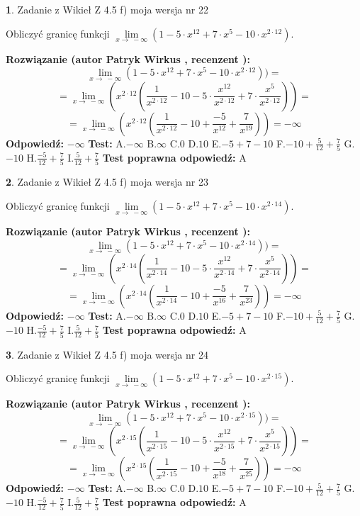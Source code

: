 \documentclass[12pt, a4paper]{article}
\theoremstyle{definition} %
\newtheorem{zad}{}
\newcommand{\zadStart}[1]{\begin{zad}#1\newline}
\newcommand{\zadStop}{\end{zad}}
\newcommand{\rozwStart}[2]{\noindent \textbf{Rozwiązanie (autor #1 , recenzent #2): }\newline}
\newcommand{\rozwStop}{\newline}
\newcommand{\odpStart}{\noindent \textbf{Odpowiedź:}\newline}
\newcommand{\odpStop}{\newline}
\newcommand{\testStart}{\noindent \textbf{Test:}\newline}
\newcommand{\testStop}{\newline}
\newcommand{\kluczStart}{\noindent \textbf{Test poprawna odpowiedź:}\newline}
\newcommand{\kluczStop}{\newline}
\begin{document}
\zadStart{Zadanie z Wikieł Z 4.5 f) moja wersja nr 22}



Obliczyć granicę funkcji  $\lim\limits_{x\to\ -\infty}(1 - 5 \cdot x^{12}+7 \cdot x^{5}- 10 \cdot x^{2\cdot12})$.
\zadStop
\rozwStart{Patryk Wirkus}{}
$$\lim\limits_{x\to\ -\infty}(1 - 5 \cdot x^{12}+7 \cdot x^{5}- 10 \cdot x^{2\cdot12}))=$$
$$=\lim\limits_{x\to\ -\infty}(x^{2\cdot12}(\frac{1}{x^{2\cdot12}}-10 -5 \cdot \frac{x^{12}}{x^{2\cdot12}}+7 \cdot \frac{x^{5}}{x^{2\cdot12}}))=$$
$$=\lim\limits_{x\to\ -\infty}(x^{2\cdot12}(\frac{1}{x^{2\cdot12}}-10 + \frac{-5}{x^{12}}+ \frac{7}{x^{19}}))=-\infty$$
\rozwStop
\odpStart
$-\infty$
\odpStop
\testStart
A.$-\infty$ B.$\infty$ C.$0$ D.$10$ E.$-5 + 7 - 10$
F.$-10+\frac{5}{12}+\frac{7}{5}$ G.$-10$
H.$\frac{-5}{12}+\frac{7}{5}$
I.$\frac{5}{12}+\frac{7}{5}$
\testStop
\kluczStart
A
\kluczStop



\zadStart{Zadanie z Wikieł Z 4.5 f) moja wersja nr 23}



Obliczyć granicę funkcji  $\lim\limits_{x\to\ -\infty}(1 - 5 \cdot x^{12}+7 \cdot x^{5}- 10 \cdot x^{2\cdot14})$.
\zadStop
\rozwStart{Patryk Wirkus}{}
$$\lim\limits_{x\to\ -\infty}(1 - 5 \cdot x^{12}+7 \cdot x^{5}- 10 \cdot x^{2\cdot14}))=$$
$$=\lim\limits_{x\to\ -\infty}(x^{2\cdot14}(\frac{1}{x^{2\cdot14}}-10 -5 \cdot \frac{x^{12}}{x^{2\cdot14}}+7 \cdot \frac{x^{5}}{x^{2\cdot14}}))=$$
$$=\lim\limits_{x\to\ -\infty}(x^{2\cdot14}(\frac{1}{x^{2\cdot14}}-10 + \frac{-5}{x^{16}}+ \frac{7}{x^{23}}))=-\infty$$
\rozwStop
\odpStart
$-\infty$
\odpStop
\testStart
A.$-\infty$ B.$\infty$ C.$0$ D.$10$ E.$-5 + 7 - 10$
F.$-10+\frac{5}{12}+\frac{7}{5}$ G.$-10$
H.$\frac{-5}{12}+\frac{7}{5}$
I.$\frac{5}{12}+\frac{7}{5}$
\testStop
\kluczStart
A
\kluczStop



\zadStart{Zadanie z Wikieł Z 4.5 f) moja wersja nr 24}



Obliczyć granicę funkcji  $\lim\limits_{x\to\ -\infty}(1 - 5 \cdot x^{12}+7 \cdot x^{5}- 10 \cdot x^{2\cdot15})$.
\zadStop
\rozwStart{Patryk Wirkus}{}
$$\lim\limits_{x\to\ -\infty}(1 - 5 \cdot x^{12}+7 \cdot x^{5}- 10 \cdot x^{2\cdot15}))=$$
$$=\lim\limits_{x\to\ -\infty}(x^{2\cdot15}(\frac{1}{x^{2\cdot15}}-10 -5 \cdot \frac{x^{12}}{x^{2\cdot15}}+7 \cdot \frac{x^{5}}{x^{2\cdot15}}))=$$
$$=\lim\limits_{x\to\ -\infty}(x^{2\cdot15}(\frac{1}{x^{2\cdot15}}-10 + \frac{-5}{x^{18}}+ \frac{7}{x^{25}}))=-\infty$$
\rozwStop
\odpStart
$-\infty$
\odpStop
\testStart
A.$-\infty$ B.$\infty$ C.$0$ D.$10$ E.$-5 + 7 - 10$
F.$-10+\frac{5}{12}+\frac{7}{5}$ G.$-10$
H.$\frac{-5}{12}+\frac{7}{5}$
I.$\frac{5}{12}+\frac{7}{5}$
\testStop
\kluczStart
A
\kluczStop
\end{document}
